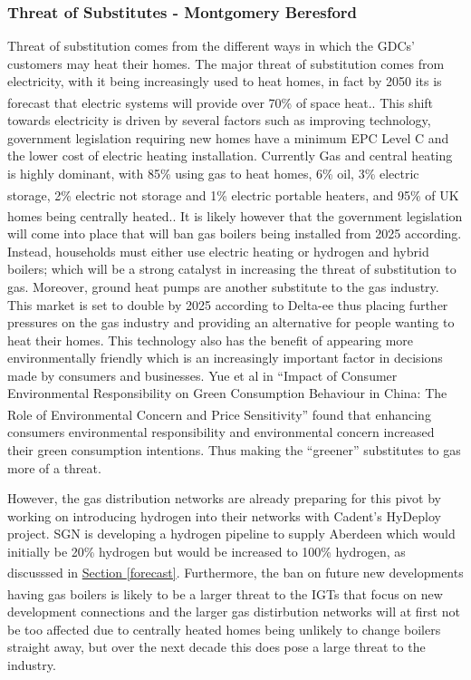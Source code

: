 \documentclass[11pt]{article}		%
\newcommand{\supercite}[1]{\textsuperscript{\cite{#1}}}		%
\newcommand{\sectref}[1]{\hyperref[#1]{Section \ref*{#1}}}     %
\begin{document}
        \subsubsection[Threat of Substitutes]{Threat of Substitutes - Montgomery Beresford} \label{customerSubstitutes}
                Threat of substitution comes from the different ways in which the GDCs’ customers may heat their homes. The major threat of substitution comes from electricity, with it being increasingly used to heat homes, in fact by 2050 its is forecast that electric systems will provide over 70\% of space heat.\supercite{heating_tech}.  This shift towards electricity is driven by several factors such as improving technology, government legislation requiring new homes have a minimum EPC Level C and the lower cost of electric heating installation. Currently Gas and central heating is highly dominant, with 85\% using gas to heat homes, 6\% oil, 3\% electric storage, 2\% electric not storage and 1\% electric portable heaters\supercite{heating}, and  95\% of UK homes being centrally heated.\supercite{central_heating}. It is likely however that the government legislation will come into place that will ban gas boilers being installed from 2025 according. Instead, households must either use electric heating or hydrogen and hybrid boilers; which will be a strong catalyst in increasing the threat of substitution to gas. 
                Moreover, ground heat pumps are another substitute to the gas industry. This market is set to double by 2025 according to Delta-ee thus placing further pressures on the gas industry and providing an alternative for people wanting to heat their homes. This technology also has the benefit of appearing more environmentally friendly which is an increasingly important factor in decisions made by consumers and businesses. Yue et al in “Impact of Consumer Environmental Responsibility on Green Consumption Behaviour in China: The Role of Environmental Concern and Price Sensitivity” \supercite{Environmental} found that enhancing consumers environmental responsibility and environmental concern increased their green consumption intentions. Thus making the “greener” substitutes to gas more of a threat.
                
                However, the gas distribution networks are already preparing for this pivot by working on introducing hydrogen into their networks with Cadent’s HyDeploy project. SGN is developing a hydrogen pipeline to supply Aberdeen which would initially be 20\% hydrogen but would be increased to 100\% hydrogen, as discusssed in \sectref{forecast}. \supercite{Cadent_Plan}
               Furthermore, the ban on future new developments having gas boilers \supercite{boiler_ban} is likely to be a larger threat to the IGTs that focus on new development connections and the larger gas distirbution networks will at first not be too affected due to centrally heated homes being unlikely to change boilers straight away, but over the next decade this does pose a large threat to the industry.
              
\end{document}
